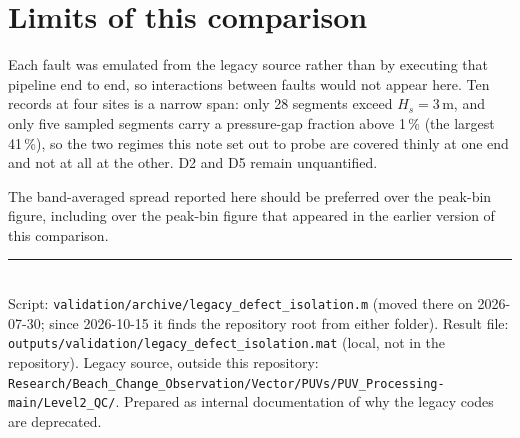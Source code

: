 \documentclass[11pt]{article}
\begin{document}
\section{Limits of this comparison}

Each fault was emulated from the legacy source rather than by executing that
pipeline end to end, so interactions between faults would not appear here. Ten
records at four sites is a narrow span: only 28 segments exceed $H_s = 3$\,m, and
only five sampled segments carry a pressure-gap fraction above 1\,\% (the largest
41\,\%), so the two regimes
this note set out to probe are covered thinly at one end and not at all at the
other. D2 and D5 remain unquantified.

The band-averaged spread reported here should be preferred over the peak-bin
figure, including over the peak-bin figure that appeared in the earlier version
of this comparison.

\vspace{1em}
\noindent\rule{\textwidth}{0.4pt}\\
\small
Script: \texttt{validation/archive/legacy\_defect\_isolation.m} (moved there on
2026-07-30; since 2026-10-15 it finds the repository root from either folder).
Result file:
\texttt{outputs/validation/legacy\_defect\_isolation.mat} (local, not in the
repository). Legacy source, outside this repository:
\texttt{Research/Beach\_Change\_Observation/Vector/PUVs/PUV\_Processing-main/Level2\_QC/}.
Prepared as internal documentation of why the legacy codes are deprecated.
\end{document}
